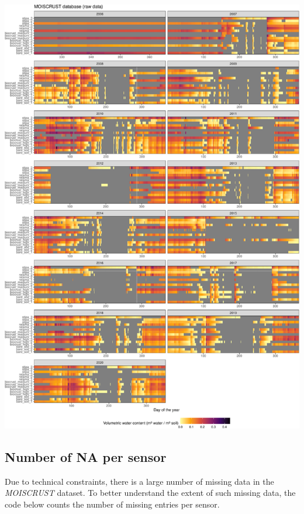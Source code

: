 \documentclass[
  table]{article}
\begin{document}
\includegraphics{moiscrust_files/figure-latex/unnamed-chunk-9-1.pdf}

\hypertarget{number-of-na-per-sensor}{%
\subsection{Number of NA per sensor}\label{number-of-na-per-sensor}}

Due to technical constraints, there is a large number of missing data in
the \emph{MOISCRUST} dataset. To better understand the extent of such
missing data, the code below counts the number of missing entries per
sensor.
\end{document}

